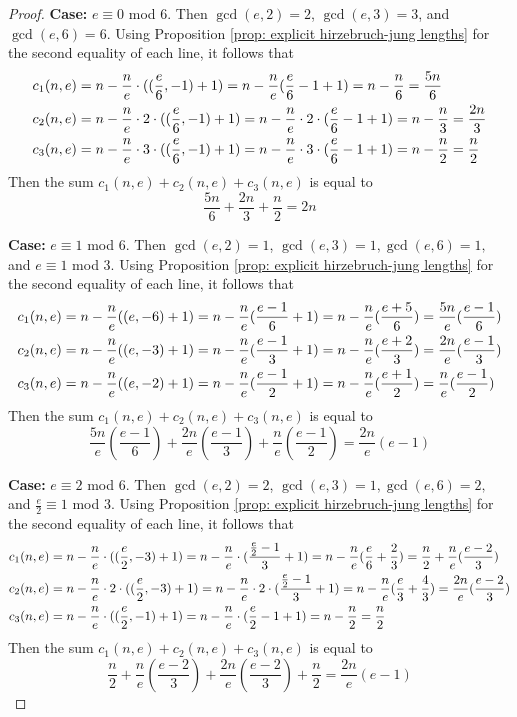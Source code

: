 \documentclass[12pt]{amsart}
\numberwithin{equation}{section}
\theoremstyle{definition}
\let\L\relax
\DeclareMathOperator{\L}{L}
\begin{document}
\begin{proof}
    \textbf{Case:} $e\equiv 0$ mod $6$. Then $\gcd(e,2)=2$, $\gcd(e,3)=3$, and $\gcd(e,6)=6$. Using Proposition \ref{prop: explicit hirzebruch-jung lengths} for the second equality of each line, it follows that
    \begin{align*}
    c_1(n,e)&=n-\frac{n}{e}\cdot(\L(\frac{e}{6},-1)+1)=n-\frac{n}{e}(\frac{e}{6}-1+1)=n-\frac{n}{6}=\frac{5n}{6}\\
    c_2(n,e)&=n-\frac{n}{e}\cdot2\cdot(\L(\frac{e}{6},-1)+1)=n-\frac{n}{e}\cdot2\cdot(\frac{e}{6}-1+1)=n-\frac{n}{3}=\frac{2n}{3}\\
    c_3(n,e)&=n-\frac{n}{e}\cdot3\cdot(\L(\frac{e}{6},-1)+1)=n-\frac{n}{e}\cdot3\cdot(\frac{e}{6}-1+1)=n-\frac{n}{2}=\frac{n}{2}
    \end{align*}
    Then the sum $c_1(n,e)+c_2(n,e)+c_3(n,e)$ is equal to
    \[\frac{5n}{6}+\frac{2n}{3}+\frac{n}{2}=2n\]

    \textbf{Case:} $e\equiv 1$ mod $6$. Then $\gcd(e,2)=1$, $\gcd(e,3)=1,\gcd(e,6)=1,$ and $e\equiv 1$ mod $3$. Using Proposition \ref{prop: explicit hirzebruch-jung lengths} for the second equality of each line, it follows that
    \begin{align*}
    c_1(n,e)&=n-\frac{n}{e}(\L(e,-6)+1)=n-\frac{n}{e}(\frac{e-1}{6}+1)=n-\frac{n}{e}(\frac{e+5}{6})=\frac{5n}{e}(\frac{e-1}{6})\\
    c_2(n,e)&=n-\frac{n}{e}(\L(e,-3)+1)=n-\frac{n}{e}(\frac{e-1}{3}+1)=n-\frac{n}{e}(\frac{e+2}{3})=\frac{2n}{e}(\frac{e-1}{3})\\
    c_3(n,e)&=n-\frac{n}{e}(\L(e,-2)+1)=n-\frac{n}{e}(\frac{e-1}{2}+1)=n-\frac{n}{e}(\frac{e+1}{2})=\frac{n}{e}(\frac{e-1}{2})
    \end{align*}
    Then the sum $c_1(n,e)+c_2(n,e)+c_3(n,e)$ is equal to
    \[\frac{5n}{e}(\frac{e-1}{6})+\frac{2n}{e}(\frac{e-1}{3})+\frac{n}{e}(\frac{e-1}{2})=\frac{2n}{e}(e-1)\]

    \textbf{Case:} $e\equiv 2$ mod $6$. Then $\gcd(e,2)=2$, $\gcd(e,3)=1,\gcd(e,6)=2,$ and $\frac{e}{2}\equiv 1$ mod $3$. Using Proposition \ref{prop: explicit hirzebruch-jung lengths} for the second equality of each line, it follows that
    \begin{align*}
        c_1(n,e)&=n-\frac{n}{e}\cdot(\L(\frac{e}{2},-3)+1)=n-\frac{n}{e}\cdot(\frac{\frac{e}{2}-1}{3}+1)=n-\frac{n}{e}(\frac{e}{6}+\frac{2}{3})=\frac{n}{2}+\frac{n}{e}(\frac{e-2}{3})\\
        c_2(n,e)&=n-\frac{n}{e}\cdot2\cdot(\L(\frac{e}{2},-3)+1)=n-\frac{n}{e}\cdot2\cdot(\frac{\frac{e}{2}-1}{3}+1)=n-\frac{n}{e}(\frac{e}{3}+\frac{4}{3})=\frac{2n}{e}(\frac{e-2}{3})\\
        c_3(n,e)&=n-\frac{n}{e}\cdot(\L(\frac{e}{2},-1)+1)=n-\frac{n}{e}\cdot(\frac{e}{2}-1+1)=n-\frac{n}{2}=\frac{n}{2}
    \end{align*}
    Then the sum $c_1(n,e)+c_2(n,e)+c_3(n,e)$ is equal to
    \[\frac{n}{2}+\frac{n}{e}(\frac{e-2}{3})+\frac{2n}{e}(\frac{e-2}{3})+\frac{n}{2}=\frac{2n}{e}(e-1)\]


\end{proof}
\end{document}
